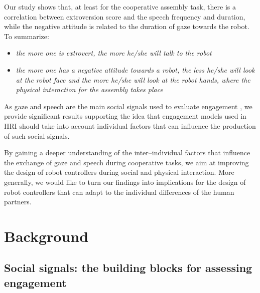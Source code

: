 Our study shows that, at least for the cooperative assembly task, there is a correlation between extroversion score and the speech frequency and duration, while the negative attitude is related to the duration of gaze towards the robot. To summarize:
\begin{itemize}
\item \emph{the more one is extrovert, the more he/she will talk to the robot}
\item \emph{the more one has a negative attitude towards a robot, the less he/she will look at the robot face and the more he/she will look at the robot hands, where the physical interaction for the assembly takes place}
\end{itemize}

As gaze and speech are the main social signals used to evaluate engagement \cite{rich2010recognizing}, we provide significant results supporting the idea that engagement models used in HRI should take into account individual factors that can influence the production of such social signals.

By gaining a deeper understanding of the inter--individual factors that influence the exchange of gaze and speech during cooperative tasks, we aim at improving the design of robot controllers during social and physical interaction.
More generally, we would like to turn our findings into implications for the design of robot controllers that can adapt to the individual differences of the human partners.




\section{Background}\label{sec:background}



\subsection{Social signals: the building blocks for assessing engagement}




